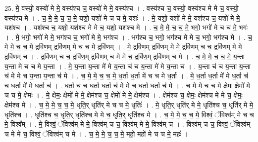 \documentclass[17pt]{extarticle}
\begin{document}
25. मे॒ वस्यो॒ वस्यो॑ मे मे॒ वस्य॑श्च च॒ वस्यो॑ मे मे॒ वस्य॑श्च । . वस्य॑श्च च॒ वस्यो॒ वस्य॑श्च मे मे च॒ वस्यो॒ वस्य॑श्च मे । . च॒ मे॒ मे॒ च॒ च॒ मे॒ यशो॒ यशो॑ मे च च मे॒ यशः॑ । . मे॒ यशो॒ यशो॑ मे मे॒ यश॑श्च च॒ यशो॑ मे मे॒ यश॑श्च । . यश॑श्च च॒ यशो॒ यश॑श्च मे मे च॒ यशो॒ यश॑श्च मे । . च॒ मे॒ मे॒ च॒ च॒ मे॒ भगो॒ भगो॑ मे च च मे॒ भगः॑ । . मे॒ भगो॒ भगो॑ मे मे॒ भग॑श्च च॒ भगो॑ मे मे॒ भग॑श्च । . भग॑श्च च॒ भगो॒ भग॑श्च मे मे च॒ भगो॒ भग॑श्च मे । . च॒ मे॒ मे॒ च॒ च॒ मे॒ द्रवि॑ण॒म् द्रवि॑णम् मे च च मे॒ द्रवि॑णम् । . मे॒ द्रवि॑ण॒म् द्रवि॑णम् मे मे॒ द्रवि॑णम् च च॒ द्रवि॑णम् मे मे॒ द्रवि॑णम् च । . द्रवि॑णम् च च॒ द्रवि॑ण॒म् द्रवि॑णम् च मे मे च॒ द्रवि॑ण॒म् द्रवि॑णम् च मे । . च॒ मे॒ मे॒ च॒ च॒ मे॒ य॒न्ता य॒न्ता मे॑ च च मे य॒न्ता । . मे॒ य॒न्ता य॒न्ता मे॑ मे य॒न्ता च॑ च य॒न्ता मे॑ मे य॒न्ता च॑ । . य॒न्ता च॑ च य॒न्ता य॒न्ता च॑ मे मे च य॒न्ता य॒न्ता च॑ मे । . च॒ मे॒ मे॒ च॒ च॒ मे॒ ध॒र्ता ध॒र्ता मे॑ च च मे ध॒र्ता । . मे॒ ध॒र्ता ध॒र्ता मे॑ मे ध॒र्ता च॑ च ध॒र्ता मे॑ मे ध॒र्ता च॑ । . ध॒र्ता च॑ च ध॒र्ता ध॒र्ता च॑ मे मे च ध॒र्ता ध॒र्ता च॑ मे । . च॒ मे॒ मे॒ च॒ च॒ मे॒ क्षेमः॒ क्षेमो॑ मे च च मे॒ क्षेमः॑ । . मे॒ क्षेमः॒ क्षेमो॑ मे मे॒ क्षेम॑श्च च॒ क्षेमो॑ मे मे॒ क्षेम॑श्च । . क्षेम॑श्च च॒ क्षेमः॒ क्षेम॑श्च मे मे च॒ क्षेमः॒ क्षेम॑श्च मे । . च॒ मे॒ मे॒ च॒ च॒ मे॒ धृति॒र् धृति॑र् मे च च मे॒ धृतिः॑ । . मे॒ धृति॒र् धृति॑र् मे मे॒ धृति॑श्च च॒ धृति॑र् मे मे॒ धृति॑श्च । . धृति॑श्च च॒ धृति॒र् धृति॑श्च मे मे च॒ धृति॒र् धृति॑श्च मे । . च॒ मे॒ मे॒ च॒ च॒ मे॒ विश्वं॒ ॅविश्व॑म् मे च च मे॒ विश्व᳚म् । . मे॒ विश्वं॒ ॅविश्व॑म् मे मे॒ विश्व॑म् च च॒ विश्व॑म् मे मे॒ विश्व॑म् च । . विश्व॑म् च च॒ विश्वं॒ ॅविश्व॑म् च मे मे च॒ विश्वं॒ ॅविश्व॑म् च मे । . च॒ मे॒ मे॒ च॒ च॒ मे॒ महो॒ महो॑ मे च च मे॒ महः॑ । \newline
\pagebreak
{}
\end{document}
